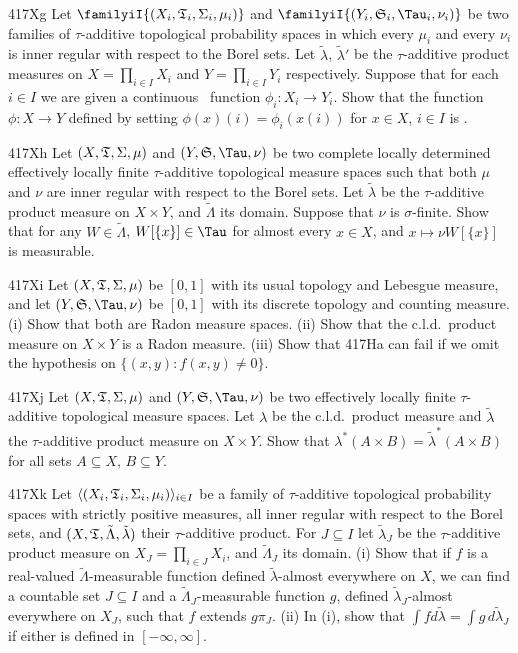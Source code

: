 {\spheader 417Xg Let $\familyiI{(X_i,\frak T_i,\Sigma_i,\mu_i)}$
and $\familyiI{(Y_i,\frak S_i,\Tau_i,\nu_i)}$ be two families of
$\tau$-additive topological probability spaces in which every $\mu_i$
and every $\nu_i$ is inner regular with respect to the Borel sets.   Let
$\tilde\lambda$, $\tilde\lambda'$ be the $\tau$-additive product
measures on $X=\prod_{i\in I}X_i$ and $Y=\prod_{i\in I}Y_i$
respectively.   Suppose that for each $i\in I$ we are given a continuous
\imp\ function $\phi_i:X_i\to Y_i$.   Show that the function
$\phi:X\to Y$ defined by setting $\phi(x)(i)=\phi_i(x(i))$ for $x\in X$,
$i\in I$ is \imp.

\spheader 417Xh Let $(X,\frak T,\Sigma,\mu)$ and
$(Y,\frak S,\Tau,\nu)$ be two complete locally determined effectively
locally
finite $\tau$-additive topological measure spaces such that both $\mu$
and $\nu$ are inner regular with respect to the Borel sets.   Let
$\tilde\lambda$ be
the $\tau$-additive product measure on $X\times Y$, and $\tilde\Lambda$
its domain.   Suppose that $\nu$ is $\sigma$-finite.   Show that for any
$W\in\tilde\Lambda$, $W[\{x\}]\in\Tau$ for almost every $x\in X$,
and $x\mapsto\nu W[\{x\}]$ is measurable.

\sqheader 417Xi Let $(X,\frak T,\Sigma,\mu)$ be $[0,1]$ with its usual
topology and Lebesgue measure, and let $(Y,\frak S,\Tau,\nu)$ be $[0,1]$
with its discrete topology and counting measure.   (i) Show that both
are Radon measure spaces.   (ii) Show that the c.l.d.\ product measure
on $X\times Y$ is a Radon measure.   
(iii) Show that 417Ha can fail if we omit the hypothesis on
$\{(x,y):f(x,y)\ne 0\}$.

\spheader 417Xj Let $(X,\frak T,\Sigma,\mu)$ and $(Y,\frak S,\Tau,\nu)$
be two effectively locally finite $\tau$-additive topological measure
spaces.   Let $\lambda$ be the c.l.d.\ product measure and
$\tilde\lambda$ the $\tau$-additive product measure on $X\times
Y$.   Show that $\lambda^*(A\times B)=\tilde\lambda^*(A\times B)$ for
all sets $A\subseteq X$, $B\subseteq Y$.   

\spheader 417Xk Let $\langle(X_i,\frak T_i,\Sigma_i,\mu_i)\rangle_{i\in
I}$ be a family of $\tau$-additive topological probability spaces with
strictly positive measures, all inner regular with respect to the Borel
sets, and $(X,\frak T,\tilde\Lambda,\tilde\lambda)$ their
$\tau$-additive product.   For $J\subseteq I$ let $\tilde\lambda_J$ be
the $\tau$-additive product measure on $X_J=\prod_{i\in J}X_i$, and
$\tilde\Lambda_J$ its domain.   (i) Show that if $f$ is a real-valued
$\tilde\Lambda$-measurable function defined $\tilde\lambda$-almost
everywhere on $X$, we can find a countable set $J\subseteq I$ and a
$\tilde\Lambda_J$-measurable function $g$, defined
$\tilde\lambda_J$-almost
everywhere on $X_J$, such that $f$ extends $g\pi_J$.   (ii) In (i), show
that $\int fd\tilde\lambda=\int g\,d\tilde\lambda_J$ if either is
defined in $[-\infty,\infty]$.

}
